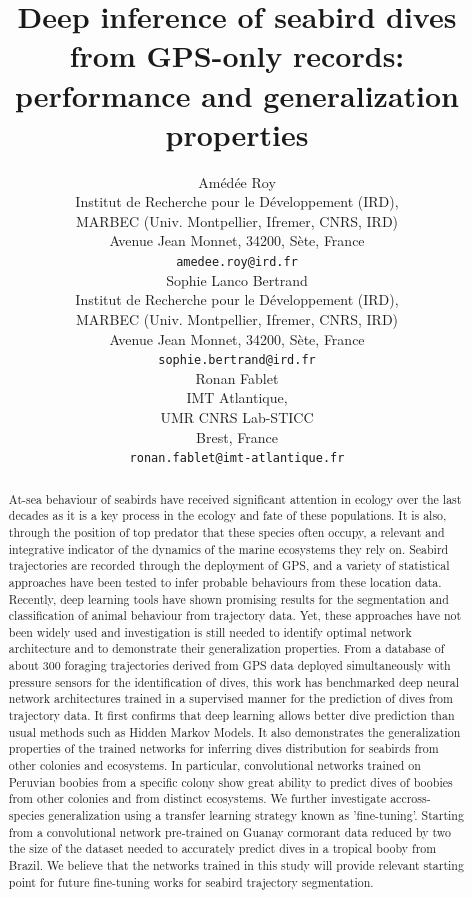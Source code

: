 \documentclass{article}
\title{Deep inference of seabird dives from GPS-only records: performance and generalization properties}
\author{
  Amédée Roy \\
  Institut de Recherche pour le Développement (IRD),\\
  MARBEC (Univ. Montpellier, Ifremer, CNRS, IRD)\\
  Avenue Jean Monnet, 34200, Sète, France \\
  \texttt{amedee.roy@ird.fr} \\
   \And
  Sophie Lanco Bertrand \\
  Institut de Recherche pour le Développement (IRD),\\
  MARBEC (Univ. Montpellier, Ifremer, CNRS, IRD)\\
  Avenue Jean Monnet, 34200, Sète, France \\
  \texttt{sophie.bertrand@ird.fr} \\
  \And
  Ronan Fablet \\
  IMT Atlantique,\\
  UMR CNRS Lab-STICC\\
  Brest, France \\
  \texttt{ronan.fablet@imt-atlantique.fr} \\
}
\begin{document}
\maketitle
\linenumbers
\doublespacing

\begin{abstract}
At-sea behaviour of seabirds have received significant attention in ecology over the last decades as it is a key process in the ecology and fate of these populations. It is also, through the position of top predator that these species often occupy, a relevant and integrative indicator of the dynamics of the marine ecosystems they rely on. Seabird trajectories are recorded through the deployment of GPS, and a variety of statistical approaches have been tested to infer probable behaviours from these location data. Recently, deep learning tools have shown promising results for the segmentation and classification of animal behaviour from trajectory data. Yet, these approaches have not been widely used and  investigation is still needed to identify optimal network architecture and to demonstrate their generalization properties. From a database of about 300 foraging trajectories derived from GPS data deployed simultaneously with pressure sensors for the identification of dives, this work has benchmarked deep neural network architectures trained in a supervised manner for the prediction of dives from trajectory data. It first confirms that deep learning allows better dive prediction than usual methods such as Hidden Markov Models. It also demonstrates the generalization properties of the trained networks for inferring dives distribution for seabirds from other colonies and ecosystems. In particular, convolutional networks trained on Peruvian boobies from a specific colony show great ability to predict dives of boobies from other colonies and from distinct ecosystems. We further investigate accross-species generalization using a transfer learning strategy known as 'fine-tuning'. Starting from a convolutional network pre-trained on Guanay cormorant data reduced by two the size of the dataset needed to accurately predict dives in a tropical booby from Brazil. We believe that the networks trained in this study will provide relevant starting point for future fine-tuning works for seabird trajectory segmentation.
\end{abstract}

\end{document}
